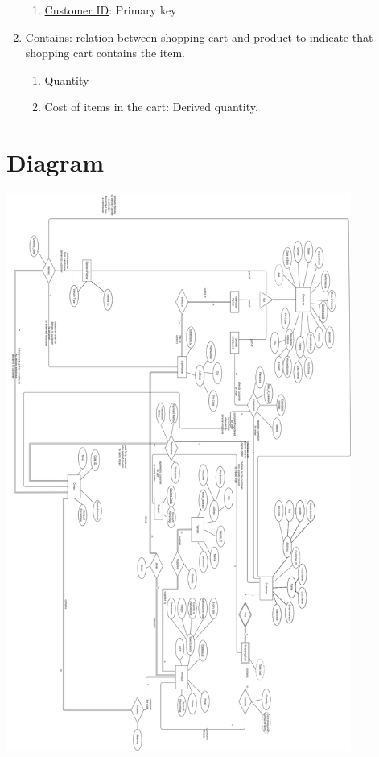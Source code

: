 \documentclass[12pt]{report}
\begin{document}
\begin{enumerate}
			\begin{enumerate}
				\item \underline{Customer ID}: Primary key
			\end{enumerate}
	\item Contains: relation between shopping cart and product to indicate that shopping cart contains the item.
		\begin{enumerate}
			\item Quantity
			\item Cost of items in the cart: Derived quantity.
		\end{enumerate}
	\end{enumerate}


	\section{Diagram}
	\includegraphics[width =0.85\textwidth]{Pictures/ER_Diagram.png}
\end{document}
